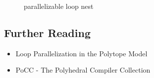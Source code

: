 \lstset{frame=none}
\begin{figure}[htbp]
  \centering
    
  \caption{parallelizable loop nest}
  \label{lst:ExampleLoopNestTransformed} 
\end{figure}
\resetlst

\yellow
\begin{shaded}
\subsection*{Further Reading}
\begin{itemize}
  \item Loop Parallelization in the Polytope Model \cite{Lengauer93loopparallelization}  
  \item PoCC - The Polyhedral Compiler Collection \cite{PoCC:Online}
\end{itemize}

\end{shaded}


